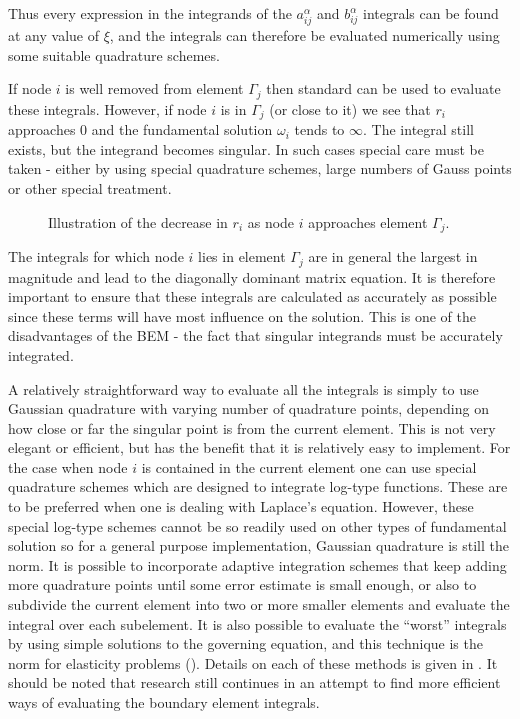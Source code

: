 Thus every expression in the integrands of the $a_{ij}^{\alpha}$ and
$b_{ij}^{\alpha}$ integrals can be found at any value of $\xi$, and the
integrals can therefore be evaluated numerically using some suitable
quadrature schemes.

If node $i$ is well removed from element $\Gamma_{j}$ then standard 
 can be used to evaluate these integrals.  However,
if node $i$ is in $\Gamma_{j}$ (or close to it) we see that $r_{i}$ approaches
0 and the fundamental solution $\omega_{i}$ tends to $\infty$.  The integral
still exists, but the integrand becomes singular.  In such cases special care
must be taken - either by using special quadrature schemes, large numbers of
Gauss points or other special treatment.

\begin{figure}[htbp] \centering
  
  \caption{Illustration of the decrease in $r_{i}$ as node $i$ approaches 
    element $\Gamma_{j}$.}
  \label{fig:decri}
\end{figure}

The integrals for which node $i$ lies in element $\Gamma_{j}$ are in general
the largest in magnitude and lead to the diagonally dominant matrix equation.
It is therefore important to ensure that these integrals are calculated as
accurately as possible since these terms will have most influence on the
solution.  This is one of the disadvantages of the BEM - the fact that
singular integrands must be accurately integrated.

A relatively straightforward way to evaluate all the integrals is simply to use
Gaussian quadrature with varying number of quadrature points, depending on how
close or far the singular point is from the current element.  This is not very
elegant or efficient, but has the benefit that it is relatively easy to
implement.  For the case when node $i$ is contained in the current element one
can use special quadrature schemes which are designed to integrate log-type
functions.  These are to be preferred when one is dealing with Laplace's
equation.  However, these special log-type schemes cannot be so readily used
on other types of fundamental solution so for a general purpose
implementation, Gaussian quadrature is still the norm. It is possible to
incorporate adaptive integration schemes that keep adding more quadrature
points until some error estimate is small enough, or also to subdivide the
current element into two or more smaller elements and evaluate the integral
over each subelement.  It is also possible to evaluate the ``worst'' integrals
by using simple solutions to the governing equation, and this technique is the
norm for elasticity problems (). Details on each
of these methods is given in .  It should be noted that
research still continues in an attempt to find more efficient ways of
evaluating the boundary element integrals.


